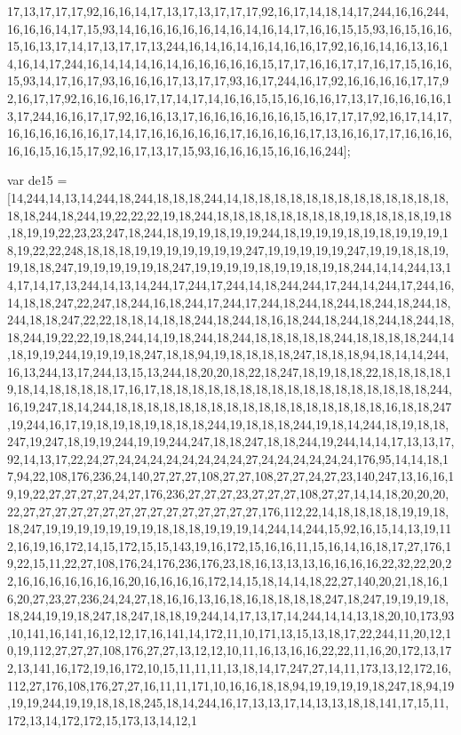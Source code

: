 17,13,17,17,17,92,16,16,14,17,13,17,13,17,17,17,92,16,17,14,18,14,17,244,16,16,244,16,16,16,14,17,15,93,14,16,16,16,16,16,14,16,14,16,14,17,16,16,15,15,93,16,15,16,16,15,16,13,17,14,17,13,17,17,13,244,16,14,16,14,16,14,16,16,17,92,16,16,14,16,13,16,14,16,14,17,244,16,14,14,14,16,14,16,16,16,16,16,15,17,17,16,16,17,17,16,17,15,16,16,15,93,14,17,16,17,93,16,16,16,17,13,17,17,93,16,17,244,16,17,92,16,16,16,16,17,17,92,16,17,17,92,16,16,16,16,17,17,14,17,14,16,16,15,15,16,16,16,17,13,17,16,16,16,16,13,17,244,16,16,17,17,92,16,16,13,17,16,16,16,16,16,16,15,16,17,17,17,92,16,17,14,17,16,16,16,16,16,16,17,14,17,16,16,16,16,16,17,16,16,16,16,17,13,16,16,17,17,16,16,16,16,16,15,16,15,17,92,16,17,13,17,15,93,16,16,16,15,16,16,16,244];

var de15 = [14,244,14,13,14,244,18,244,18,18,18,244,14,18,18,18,18,18,18,18,18,18,18,18,18,18,18,18,244,18,244,19,22,22,22,19,18,244,18,18,18,18,18,18,18,18,19,18,18,18,18,19,18,18,19,19,22,23,23,247,18,244,18,19,19,18,19,19,244,18,19,19,19,18,19,18,19,19,19,18,19,22,22,248,18,18,18,19,19,19,19,19,19,19,247,19,19,19,19,19,247,19,19,18,18,19,19,18,18,247,19,19,19,19,19,18,247,19,19,19,19,18,19,19,18,19,18,244,14,14,244,13,14,17,14,17,13,244,14,13,14,244,17,244,17,244,14,18,244,244,17,244,14,244,17,244,16,14,18,18,247,22,247,18,244,16,18,244,17,244,17,244,18,244,18,244,18,244,18,244,18,244,18,18,247,22,22,18,18,14,18,18,244,18,244,18,16,18,244,18,244,18,244,18,244,18,18,244,19,22,22,19,18,244,14,19,18,244,18,244,18,18,18,18,18,244,18,18,18,18,244,14,18,19,19,244,19,19,19,18,247,18,18,94,19,18,18,18,18,247,18,18,18,94,18,14,14,244,16,13,244,13,17,244,13,15,13,244,18,20,20,18,22,18,247,18,19,18,18,22,18,18,18,18,19,18,14,18,18,18,18,17,16,17,18,18,18,18,18,18,18,18,18,18,18,18,18,18,18,18,18,244,16,19,247,18,14,244,18,18,18,18,18,18,18,18,18,18,18,18,18,18,18,18,18,16,18,18,247,19,244,16,17,19,18,19,18,19,18,18,18,244,19,18,18,18,244,19,18,14,244,18,19,18,18,247,19,247,18,19,19,244,19,19,244,247,18,18,247,18,18,244,19,244,14,14,17,13,13,17,92,14,13,17,22,24,27,24,24,24,24,24,24,24,24,27,24,24,24,24,24,24,176,95,14,14,18,17,94,22,108,176,236,24,140,27,27,27,108,27,27,108,27,27,24,27,23,140,247,13,16,16,19,19,22,27,27,27,27,24,27,176,236,27,27,27,23,27,27,27,108,27,27,14,14,18,20,20,20,22,27,27,27,27,27,27,27,27,27,27,27,27,27,27,27,176,112,22,14,18,18,18,18,19,19,18,18,247,19,19,19,19,19,19,19,18,18,18,19,19,19,14,244,14,244,15,92,16,15,14,13,19,112,16,19,16,172,14,15,172,15,15,143,19,16,172,15,16,16,11,15,16,14,16,18,17,27,176,19,22,15,11,22,27,108,176,24,176,236,176,23,18,16,13,13,13,16,16,16,16,22,32,22,20,22,16,16,16,16,16,16,16,20,16,16,16,16,172,14,15,18,14,14,18,22,27,140,20,21,18,16,16,20,27,23,27,236,24,24,27,18,16,16,13,16,18,16,18,18,18,18,247,18,247,19,19,19,18,18,244,19,19,18,247,18,247,18,18,19,244,14,17,13,17,14,244,14,14,13,18,20,10,173,93,10,141,16,141,16,12,12,17,16,141,14,172,11,10,171,13,15,13,18,17,22,244,11,20,12,10,19,112,27,27,27,108,176,27,27,13,12,12,10,11,16,13,16,16,22,22,11,16,20,172,13,172,13,141,16,172,19,16,172,10,15,11,11,11,13,18,14,17,247,27,14,11,173,13,12,172,16,112,27,176,108,176,27,27,16,11,11,171,10,16,16,18,18,94,19,19,19,19,18,247,18,94,19,19,19,244,19,19,18,18,18,245,18,14,244,16,17,13,13,17,14,13,13,18,18,141,17,15,11,172,13,14,172,172,15,173,13,14,12,1